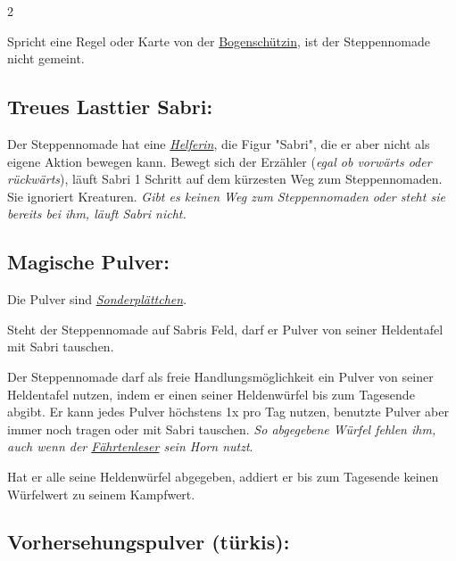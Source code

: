 \documentclass[10pt, a4paper, oneside]{book}
\newcommand{\fan}[1]{\textit{#1}}
\begin{document}
\begin{multicols*}{2}
\begin{nobgcolor}
Spricht eine Regel oder Karte von der \hyperref[Bogenschützin]{Bogenschützin}, ist der Steppennomade nicht gemeint.



\subsection{Treues Lasttier Sabri:}

Der Steppennomade hat eine \hyperref[Helfer]{\fan{Helferin}}, die Figur "Sabri", die er aber nicht als eigene Aktion bewegen kann. Bewegt sich der Erzähler (\fan{egal ob vorwärts oder rückwärts}), läuft Sabri 1 Schritt auf dem kürzesten Weg zum Steppennomaden.
\supercite{MH:Steppennomade}
Sie ignoriert Kreaturen.
\supercite{MH:Begleitheft}
\fan{Gibt es keinen Weg zum Steppennomaden oder steht sie bereits bei ihm, läuft Sabri nicht.}






\subsection{Magische Pulver:}

Die Pulver sind \hyperref[Gegenstände und Sonderplättchen]{\fan{Sonderplättchen}}.

Steht der Steppennomade auf Sabris Feld, darf er Pulver von seiner Heldentafel mit Sabri tauschen.
\supercite{MH:Steppennomade,MH:Begleitheft}

Der Steppennomade darf als freie Handlungsmöglichkeit ein Pulver von seiner Heldentafel nutzen, indem er einen seiner Heldenwürfel bis zum Tagesende abgibt.
\supercite{MH:Begleitheft}
Er kann jedes Pulver höchstens 1x pro Tag nutzen, benutzte Pulver aber immer noch tragen oder mit Sabri tauschen.
\supercite{88552}
\fan{So abgegebene Würfel fehlen ihm, auch wenn der \hyperref[Fährtenleser]{Fährtenleser} sein Horn nutzt}.

Hat er alle seine Heldenwürfel abgegeben, addiert er bis zum Tagesende keinen Würfelwert zu seinem Kampfwert. 



\columnbreak



\subsection{Vorhersehungspulver (türkis):}


\end{nobgcolor}
\end{multicols*}
\end{document}
